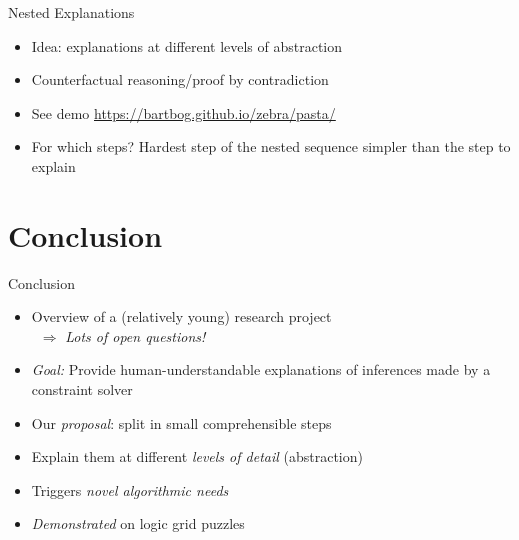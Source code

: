 \documentclass[12pt,aspectratio=169]{beamer}
\begin{document}
\begin{frame}{Nested Explanations}
\begin{itemize}
   \item Idea: explanations at different levels of abstraction
  \item Counterfactual reasoning/proof by contradiction
  \item See demo \url{https://bartbog.github.io/zebra/pasta/}
\pause
\item For which steps? Hardest step of the nested sequence simpler than the step to explain
\end{itemize}
  
\end{frame}


\section{Conclusion}








\begin{frame}{Conclusion}
  \begin{itemize}
    \item Overview of a (relatively young) research project\\
    \qquad\ \qquad$\Rightarrow$ \emph{Lots of open questions!}
    \item \emph{Goal:}  Provide human-understandable explanations of inferences made by a constraint solver 
    \item Our \emph{proposal}: split in small comprehensible steps
    \item Explain them at different \emph{levels of detail} (abstraction)
    \item Triggers \emph{novel algorithmic needs}
    \item \emph{Demonstrated} on logic grid puzzles
  \end{itemize}

\end{frame}


% 
\end{document}
